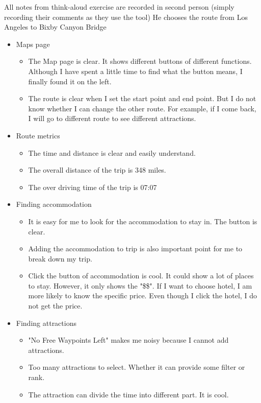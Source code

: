 All notes from think-aloud exercise are recorded in second person (simply recording their comments as they use the tool)
He chooses the route from Los Angeles to Bixby Canyon Bridge

\begin{itemize}
\item Maps page
  \begin{itemize}
  \item The Map page is clear. It shows different buttons of different functions. Although I have spent a little time to find what the button means, I finally found it on the left.
  \item The route is clear when I set the start point and end point. But I do not know whether I can change the other route. For example, if I come back, I will go to different route to see different attractions.
  \end{itemize}
\item Route metrics
  \begin{itemize}
  \item The time and distance is clear and easily understand.
  \item The overall distance of the trip is 348 miles.
  \item The over driving time of the trip is 07:07
  \end{itemize}
\item Finding accommodation
  \begin{itemize}
  \item It is easy for me to look for the accommodation to stay in. The button is clear.
  \item Adding the accommodation to trip is also important point for me to break down my trip.
  \item Click the button of accommodation is cool. It could show a lot of places to stay. However, it only shows the "\$\$". If I want to choose hotel, I am more likely to know the specific price. Even though I click the hotel, I do not get the price.
  \end{itemize}
\item Finding attractions
  \begin{itemize}
  \item "No Free Waypoints Left" makes me noisy because I cannot add attractions.
  \item Too many attractions to select. Whether it can provide some filter or rank.
  \item The attraction can divide the time into different part. It is cool.

\end{itemize}
\end{itemize}
